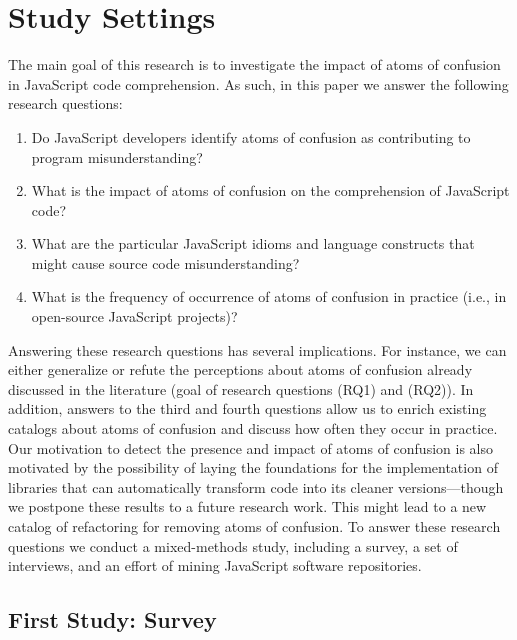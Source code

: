 \section{Study Settings}
\label{method}

The main goal of this research is to investigate the impact of atoms of confusion in JavaScript code comprehension. As such, in this paper we answer the following research questions: 

\begin{enumerate}[(RQ1)]
    \item Do JavaScript developers identify atoms of confusion as contributing to program misunderstanding? 
    \item What is the impact of atoms of confusion on the comprehension of JavaScript code? 
    \item What are the particular JavaScript idioms and language constructs that might cause source code misunderstanding?
    \item What is the frequency of occurrence of atoms of confusion in practice (i.e., in open-source JavaScript projects)?
\end{enumerate}

 
Answering these research questions has several implications. For instance, we can either generalize or refute the perceptions about atoms of confusion already discussed in the literature (goal of research questions (RQ1) and (RQ2)). In addition, answers to the third and fourth questions allow us to enrich existing catalogs about atoms of confusion and discuss how often they occur in practice. Our motivation to detect the presence and impact of atoms of confusion is also motivated by the possibility of laying the foundations for the implementation of libraries that can automatically transform code into its cleaner versions---though we postpone these results to a future research work. This might lead to a new catalog of refactoring for removing atoms of confusion.  To answer these research questions we conduct a mixed-methods study, including a survey, a set of interviews, and an effort of mining JavaScript software repositories.  


 \subsection{First Study: Survey}\label{sec:survey-settings}

